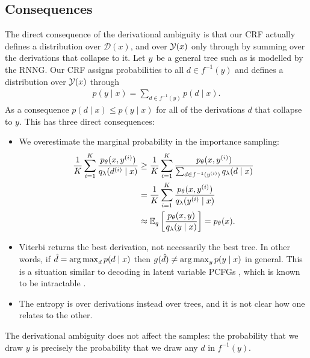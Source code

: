   \subsection{Consequences}
    The direct consequence of the derivational ambiguity is that our CRF actually defines a distribution over $\mathcal{D}(x)$, and over $\mathcal{Y}(x)$ only through by summing over the derivations that collapse to it. Let $y$ be a general tree such as is modelled by the RNNG. Our CRF assigns probabilities to all $d \in f^{-1}(y)$ and defines a distribution over $\mathcal{Y}(x)$ through
    \begin{align*}
      p(y \mid x) = \sum_{d \in f^{-1}(y)} p(d \mid x).
    \end{align*}
    As a consequence $p(d \mid x) \leq p(y \mid x)$ for all of the derivations $d$ that collapse to $y$. This has three direct consequences:
    \begin{itemize}
      \item We overestimate the marginal probability in the importance sampling:
        \begin{align*}
          \frac{1}{K}\sum_{i=1}^K  \frac{p_{\theta}( x, y^{(i)} )}{q_{\lambda}(d^{(i)} \mid x)}
            &\geq \frac{1}{K}\sum_{i=1}^K  \frac{p_{\theta}( x, y^{(i)} )}{\sum_{d \in f^{-1}(y^{(i)})} q_{\lambda}(d \mid x)}  \\
            &= \frac{1}{K}\sum_{i=1}^K  \frac{p_{\theta}( x, y^{(i)} )}{q_{\lambda}(y^{(i)} \mid x)}  \\
            &\approx \operatorname{\mathbb{E}}_{q} \bigg[\frac{p_{\theta}(x,y )}{q_{\lambda}(y \mid x)} \bigg] = p_{\theta}(x).
        \end{align*}
      \item Viterbi returns the best derivation, not necessarily the best tree. In other words, if $\hat{d} = \operatorname*{arg\,max}_d p(d \mid x)$ then $g(\hat{d}) \neq \operatorname*{arg\,max}_y p(y \mid x)$ in general. This is a situation similar to decoding in latent variable PCFGs \citep{petrov2006learning}, which is known to be intractable \citep{sima2002computational}.
      \item The entropy is over derivations instead over trees, and it is not clear how one relates to the other.
    \end{itemize}
    The derivational ambiguity does not affect the samples: the probability that we draw $y$ is precisely the probability that we draw any $d$ in $f^{-1}(y)$.

